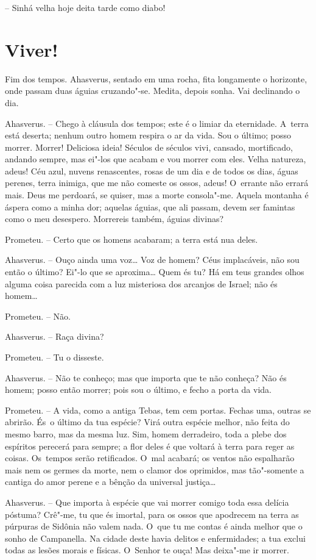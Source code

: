 -- Sinhá velha hoje deita tarde como diabo!

\chapter{Viver!}

Fim dos tempos. Ahasverus, sentado em uma rocha, fita longamente o
horizonte, onde passam duas águias cruzando"-se. Medita, depois sonha.
Vai declinando o dia.

Ahasverus. -- Chego à cláusula dos tempos; este é o limiar da
eternidade. A~terra está deserta; nenhum outro homem respira o ar da
vida. Sou o último; posso morrer. Morrer! Deliciosa ideia! Séculos de
séculos vivi, cansado, mortificado, andando sempre, mas ei"-los que
acabam e vou morrer com eles. Velha natureza, adeus! Céu azul, nuvens
renascentes, rosas de um dia e de todos os dias, águas perenes, terra
inimiga, que me não comeste os ossos, adeus! O~errante não errará mais.
Deus me perdoará, se quiser, mas a morte consola"-me. Aquela montanha é
áspera como a minha dor; aquelas águias, que ali passam, devem ser
famintas como o meu desespero. Morrereis também, águias divinas?

Prometeu. -- Certo que os homens acabaram; a terra está nua deles.

Ahasverus. -- Ouço ainda uma voz\ldots{} Voz de homem? Céus implacáveis, não
sou então o último? Ei"-lo que se aproxima\ldots{} Quem és tu? Há em teus
grandes olhos alguma coisa parecida com a luz misteriosa dos arcanjos de
Israel; não és homem\ldots{}

Prometeu. -- Não.

Ahasverus. -- Raça divina?

Prometeu. -- Tu o disseste.

Ahasverus. -- Não te conheço; mas que importa que te não conheça? Não és
homem; posso então morrer; pois sou o último, e fecho a porta da vida.

Prometeu. -- A vida, como a antiga Tebas, tem cem portas. Fechas uma,
outras se abrirão. És~o último da tua espécie? Virá outra espécie
melhor, não feita do mesmo barro, mas da mesma luz. Sim, homem
derradeiro, toda a plebe dos espíritos perecerá para sempre; a flor
deles é que voltará à terra para reger as coisas. Os~tempos serão
retificados. O~mal acabará; os ventos não espalharão mais nem os germes
da morte, nem o clamor dos oprimidos, mas tão"-somente a cantiga do amor
perene e a bênção da universal justiça\ldots{}

Ahasverus. -- Que importa à espécie que vai morrer comigo toda essa
delícia póstuma? Crê"-me, tu que és imortal, para os ossos que apodrecem
na terra as púrpuras de Sidônia não valem nada. O~que tu me contas é
ainda melhor que o sonho de Campanella. Na cidade deste havia delitos e
enfermidades; a tua exclui todas as lesões morais e físicas. O~Senhor te
ouça! Mas deixa"-me ir morrer.

